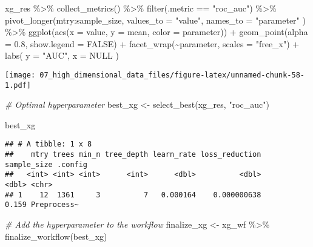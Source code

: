 \documentclass[
]{book}
\newenvironment{Shaded}{\begin{snugshade}}{\end{snugshade}}
\newcommand{\AttributeTok}[1]{\textcolor[rgb]{0.77,0.63,0.00}{#1}}
\newcommand{\CommentTok}[1]{\textcolor[rgb]{0.56,0.35,0.01}{\textit{#1}}}
\newcommand{\ConstantTok}[1]{\textcolor[rgb]{0.00,0.00,0.00}{#1}}
\newcommand{\FloatTok}[1]{\textcolor[rgb]{0.00,0.00,0.81}{#1}}
\newcommand{\FunctionTok}[1]{\textcolor[rgb]{0.00,0.00,0.00}{#1}}
\newcommand{\NormalTok}[1]{#1}
\newcommand{\OtherTok}[1]{\textcolor[rgb]{0.56,0.35,0.01}{#1}}
\newcommand{\SpecialCharTok}[1]{\textcolor[rgb]{0.00,0.00,0.00}{#1}}
\newcommand{\StringTok}[1]{\textcolor[rgb]{0.31,0.60,0.02}{#1}}
\begin{document}
\begin{Shaded}
\begin{Highlighting}[]
\NormalTok{xg\_res }\SpecialCharTok{\%\textgreater{}\%}
  \FunctionTok{collect\_metrics}\NormalTok{() }\SpecialCharTok{\%\textgreater{}\%}
  \FunctionTok{filter}\NormalTok{(.metric }\SpecialCharTok{==} \StringTok{"roc\_auc"}\NormalTok{) }\SpecialCharTok{\%\textgreater{}\%}
  \FunctionTok{pivot\_longer}\NormalTok{(mtry}\SpecialCharTok{:}\NormalTok{sample\_size,}
    \AttributeTok{values\_to =} \StringTok{"value"}\NormalTok{,}
    \AttributeTok{names\_to =} \StringTok{"parameter"}
\NormalTok{  ) }\SpecialCharTok{\%\textgreater{}\%}
  \FunctionTok{ggplot}\NormalTok{(}\FunctionTok{aes}\NormalTok{(}\AttributeTok{x =}\NormalTok{ value, }\AttributeTok{y =}\NormalTok{ mean, }\AttributeTok{color =}\NormalTok{ parameter)) }\SpecialCharTok{+}
  \FunctionTok{geom\_point}\NormalTok{(}\AttributeTok{alpha =} \FloatTok{0.8}\NormalTok{, }\AttributeTok{show.legend =} \ConstantTok{FALSE}\NormalTok{) }\SpecialCharTok{+}
  \FunctionTok{facet\_wrap}\NormalTok{(}\SpecialCharTok{\textasciitilde{}}\NormalTok{parameter, }\AttributeTok{scales =} \StringTok{"free\_x"}\NormalTok{) }\SpecialCharTok{+}
  \FunctionTok{labs}\NormalTok{(}
    \AttributeTok{y =} \StringTok{"AUC"}\NormalTok{,}
    \AttributeTok{x =} \ConstantTok{NULL}
\NormalTok{  )}
\end{Highlighting}
\end{Shaded}

\texttt{[image: 07\_high\_dimensional\_data\_files/figure-latex/unnamed-chunk-58-1.pdf]}

\begin{Shaded}
\begin{Highlighting}[]
\CommentTok{\# Optimal hyperparameter}
\NormalTok{best\_xg }\OtherTok{\textless{}{-}} \FunctionTok{select\_best}\NormalTok{(xg\_res, }\StringTok{"roc\_auc"}\NormalTok{)}

\NormalTok{best\_xg}
\end{Highlighting}
\end{Shaded}

\begin{verbatim}
## # A tibble: 1 x 8
##    mtry trees min_n tree_depth learn_rate loss_reduction sample_size .config    
##   <int> <int> <int>      <int>      <dbl>          <dbl>       <dbl> <chr>      
## 1    12  1361     3          7   0.000164    0.000000638       0.159 Preprocess~
\end{verbatim}

\begin{Shaded}
\begin{Highlighting}[]
\CommentTok{\# Add the hyperparameter to the workflow}
\NormalTok{finalize\_xg }\OtherTok{\textless{}{-}}\NormalTok{ xg\_wf }\SpecialCharTok{\%\textgreater{}\%}
  \FunctionTok{finalize\_workflow}\NormalTok{(best\_xg)}
\end{Highlighting}
\end{Shaded}
\end{document}

